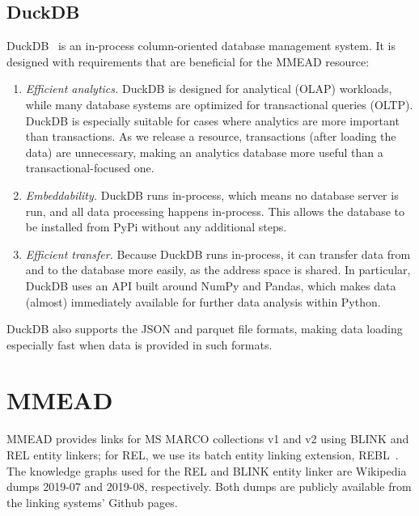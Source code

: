 \subsection{DuckDB}
DuckDB~\citep{duckdb} is an in-process column-oriented database management system. It is designed with requirements that are beneficial for the MMEAD resource:
\begin{enumerate}
	\item \emph{Efficient analytics.} DuckDB is designed for analytical (OLAP) workloads, while many database systems are optimized for transactional queries (OLTP). DuckDB is especially suitable for cases where analytics are more important than transactions. As we release a resource, transactions (after loading the data) are unnecessary, making an analytics database more useful than a transactional-focused one. 
	\item \emph{Embeddability.} DuckDB runs in-process, which means no database server is run, and all data processing happens in-process. This allows the database to be installed from PyPi without any additional steps. 
	\item \emph{Efficient transfer.} Because DuckDB runs in-process, it can transfer data from and to the database more easily, as the address space is shared. In particular, DuckDB uses an API built around NumPy and Pandas, which makes data (almost) immediately available for further data analysis within Python. 
\end{enumerate}
DuckDB also supports the JSON and parquet file formats, making data loading especially fast when data is provided in such formats.

\section{MMEAD}
MMEAD provides links for MS MARCO collections v1 and v2 using BLINK and REL entity linkers; for REL, we use its batch entity linking extension, REBL~\citep{rebl}. The knowledge graphs used for the REL and BLINK entity linker are Wikipedia dumps 2019-07 and 2019-08, respectively. Both dumps are publicly available from the linking systems' Github pages. 

